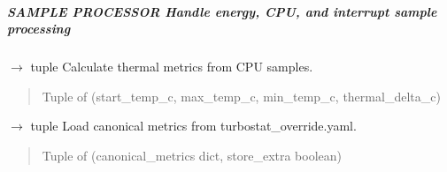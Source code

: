 \documentclass[letterpaper,10pt,english]{sphinxmanual}
\begin{document}
\subparagraph{SAMPLE PROCESSOR \textendash{} Handle energy, CPU, and interrupt sample processing}
\label{\detokenize{core.execution.sample_processor:sample-processor-handle-energy-cpu-and-interrupt-sample-processing}}

\begin{fulllineitems}
\label{\detokenize{core.execution.sample_processor:core.execution.sample_processor.calculate_thermal_metrics}}
\pysigstartsignatures
\pysiglinewithargsret
{}
{}
{{ $\rightarrow$ tuple}}
\pysigstopsignatures
\sphinxAtStartPar
Calculate thermal metrics from CPU samples.
\begin{quote}\begin{description}
\sphinxAtStartPar
Tuple of (start\_temp\_c, max\_temp\_c, min\_temp\_c, thermal\_delta\_c)

\end{description}\end{quote}

\end{fulllineitems}


\begin{fulllineitems}
\label{\detokenize{core.execution.sample_processor:core.execution.sample_processor.load_canonical_metrics}}
\pysigstartsignatures
\pysiglinewithargsret
{}
{}
{{ $\rightarrow$ tuple}}
\pysigstopsignatures
\sphinxAtStartPar
Load canonical metrics from turbostat\_override.yaml.
\begin{quote}\begin{description}
\sphinxAtStartPar
Tuple of (canonical\_metrics dict, store\_extra boolean)

\end{description}\end{quote}

\end{fulllineitems}
\end{document}
